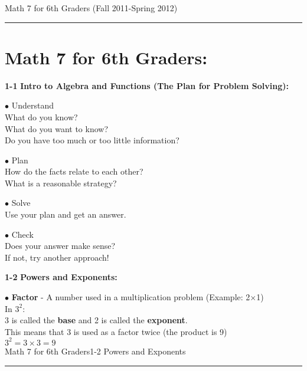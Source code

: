 \newpage
\noindent\Large{Math 7 for 6th Graders (Fall 2011-Spring 2012)}
\noindent\hrule

	\section*{Math 7 for 6th Graders:}
	\begin{enumerate*}
		\item[\Large\textbf{1-1}] \Large\textbf{Intro to Algebra and Functions (The Plan for Problem Solving):}\\
			\begin{enumerate*}
				\item[$\bullet$] Understand\\
					What do you know?\\
					What do you want to know?\\
					Do you have too much or too little information?\\
				\item[$\bullet$] Plan\\
					How do the facts relate to each other?\\
					What is a reasonable strategy?\\
				\item[$\bullet$] Solve\\
					Use your plan and get an answer.\\
				\item[$\bullet$] Check\\
					Does your answer make sense?\\
					If not, try another approach!\\
			\end{enumerate*}
			
		\item[\Large\textbf{1-2}] \Large\textbf{Powers and Exponents:}\\
			\begin{enumerate*}
			\item[$\bullet$]\textbf{Factor} - A number used in a multiplication problem (Example: 2$\times$1)\\
			In $3^2$:\\ 3 is called the \textbf{base} and 2 is called the \textbf{exponent}.\\
			This means that 3 is used as a factor twice (the product is 9)\\ $3^2=3\times3=9$\\
			
\newpage
\noindent\Large{Math 7 for 6th Graders\hfill 1-2 Powers and Exponents}
\noindent\hrule
\vspace{5mm}


\end{enumerate*}
\end{enumerate*}

